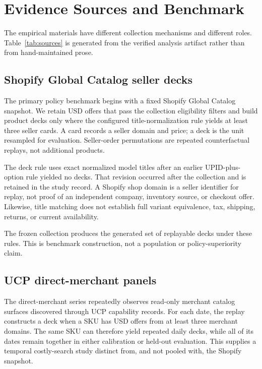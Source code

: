 \section{Evidence Sources and Benchmark}
\label{sec:benchmark}

The empirical materials have different collection mechanisms and different roles.
Table~\ref{tab:sources} is generated from the verified analysis artifact rather than
from hand-maintained prose.

\begin{table}[htbp]
  \centering
  
  \caption{Source-stratified evidence. The rows are intentionally not pooled: seller
  decks and UCP panels support separately calibrated recalled-search replays.}
  \label{tab:sources}
\end{table}

\subsection{Shopify Global Catalog seller decks}

The primary policy benchmark begins with a fixed Shopify Global Catalog snapshot.
We retain USD offers that pass the collection eligibility filters and build product
decks only where the configured title-normalization rule yields at least three seller
cards. A card records a seller domain and price; a deck is the unit resampled for
evaluation. Seller-order permutations are repeated counterfactual replays, not
additional products.

The deck rule uses exact normalized model titles after an earlier UPID-plus-option
rule yielded no decks. That revision occurred after the collection and is retained in
the study record. A Shopify shop domain is a seller identifier for replay, not
proof of an independent company, inventory source, or checkout offer. Likewise,
title matching does not establish full variant equivalence, tax, shipping, returns,
or current availability.

The frozen collection produces the generated set of replayable decks under these
rules. This is benchmark construction, not a population or policy-superiority claim.

\subsection{UCP direct-merchant panels}

The direct-merchant series repeatedly observes read-only merchant catalog surfaces
discovered through UCP capability records. For each date, the replay constructs a
deck when a SKU has USD offers from at least three merchant domains. The same SKU
can therefore yield repeated daily decks, while all of its dates remain together in
either calibration or held-out evaluation. This supplies a temporal costly-search
study distinct from, and not pooled with, the Shopify snapshot.

